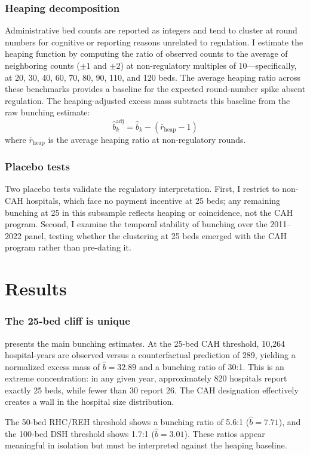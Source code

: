 \documentclass[12pt]{article}
\begin{document}
\subsubsection*{Heaping decomposition}  Administrative bed counts are reported as integers and tend to cluster at round numbers for cognitive or reporting reasons unrelated to regulation. I estimate the heaping function by computing the ratio of observed counts to the average of neighboring counts ($\pm 1$ and $\pm 2$) at non-regulatory multiples of 10---specifically, at 20, 30, 40, 60, 70, 80, 90, 110, and 120 beds. The average heaping ratio across these benchmarks provides a baseline for the expected round-number spike absent regulation. The heaping-adjusted excess mass subtracts this baseline from the raw bunching estimate:
\[
\hat{b}^{\text{adj}}_k = \hat{b}_k - (\bar{r}_{\text{heap}} - 1)
\]
where $\bar{r}_{\text{heap}}$ is the average heaping ratio at non-regulatory rounds.

\subsubsection*{Placebo tests}  Two placebo tests validate the regulatory interpretation. First, I restrict to non-CAH hospitals, which face no payment incentive at 25 beds; any remaining bunching at 25 in this subsample reflects heaping or coincidence, not the CAH program. Second, I examine the temporal stability of bunching over the 2011--2022 panel, testing whether the clustering at 25 beds emerged with the CAH program rather than pre-dating it.

\section{Results}

\subsubsection*{The 25-bed cliff is unique}   presents the main bunching estimates. At the 25-bed CAH threshold, 10,264 hospital-years are observed versus a counterfactual prediction of 289, yielding a normalized excess mass of $\hat{b} = 32.89$ and a bunching ratio of 30:1. This is an extreme concentration: in any given year, approximately 820 hospitals report exactly 25 beds, while fewer than 30 report 26. The CAH designation effectively creates a wall in the hospital size distribution.

The 50-bed RHC/REH threshold shows a bunching ratio of 5.6:1 ($\hat{b} = 7.71$), and the 100-bed DSH threshold shows 1.7:1 ($\hat{b} = 3.01$). These ratios appear meaningful in isolation but must be interpreted against the heaping baseline.
\end{document}
